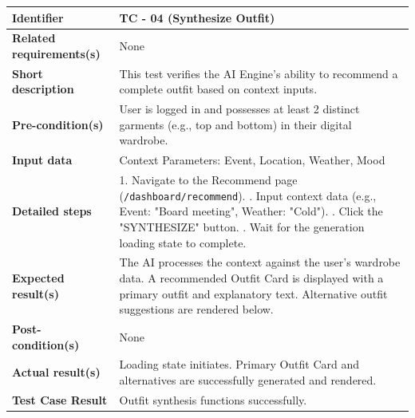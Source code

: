 \documentclass{article}
\begin{document}
\newpage

\begin{table}[h!]
\centering
\renewcommand{\arraystretch}{1.5}
\begin{tabularx}{\textwidth}{|l|X|}
\hline
\textbf{Identifier} & TC - 04 (Synthesize Outfit) \\ \hline
\textbf{Related requirements(s)} & None \\ \hline
\textbf{Short description} & This test verifies the AI Engine's ability to recommend a complete outfit based on context inputs. \\ \hline
\textbf{Pre-condition(s)} & User is logged in and possesses at least 2 distinct garments (e.g., top and bottom) in their digital wardrobe. \\ \hline
\textbf{Input data} & Context Parameters: Event, Location, Weather, Mood \\ \hline
\textbf{Detailed steps} & 
1. Navigate to the Recommend page (\texttt{/dashboard/recommend}). \newline
2. Input context data (e.g., Event: "Board meeting", Weather: "Cold"). \newline
3. Click the "SYNTHESIZE" button. \newline
4. Wait for the generation loading state to complete. \\ \hline
\textbf{Expected result(s)} & 
The AI processes the context against the user's wardrobe data. \newline
A recommended Outfit Card is displayed with a primary outfit and explanatory text. \newline
Alternative outfit suggestions are rendered below. \\ \hline
\textbf{Post-condition(s)} & None \\ \hline
\textbf{Actual result(s)} & 
Loading state initiates. \newline
Primary Outfit Card and alternatives are successfully generated and rendered. \\ \hline
\textbf{Test Case Result} & Outfit synthesis functions successfully. \\ \hline
\end{tabularx}
\end{table}

\vspace{2em}
\end{document}
